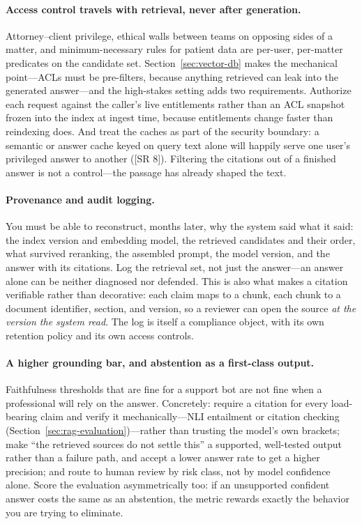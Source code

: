 \paragraph{Access control travels with retrieval, never after generation.}
Attorney--client privilege, ethical walls between teams on opposing sides of a
matter, and minimum-necessary rules for patient data are per-user, per-matter
predicates on the candidate set.  Section~\ref{sec:vector-db} makes the
mechanical point---ACLs must be pre-filters, because anything retrieved can
leak into the generated answer---and the high-stakes setting adds two
requirements.  Authorize each request against the caller's live entitlements
rather than an ACL snapshot frozen into the index at ingest time, because
entitlements change faster than reindexing does.  And treat the caches as part
of the security boundary: a semantic or answer cache keyed on query text alone
will happily serve one user's privileged answer to another ([SR 8]).
Filtering the citations out of a finished answer is not a control---the
passage has already shaped the text.

\paragraph{Provenance and audit logging.}
You must be able to reconstruct, months later, why the system said what it
said: the index version and embedding model, the retrieved candidates and
their order, what survived reranking, the assembled prompt, the model version,
and the answer with its citations.  Log the retrieval set, not just the
answer---an answer alone can be neither diagnosed nor defended.  This is also
what makes a citation verifiable rather than decorative: each claim maps to a
chunk, each chunk to a document identifier, section, and version, so a
reviewer can open the source \emph{at the version the system read}.  The log
is itself a compliance object, with its own retention policy and its own
access controls.

\paragraph{A higher grounding bar, and abstention as a first-class output.}
Faithfulness thresholds that are fine for a support bot are not fine when a
professional will rely on the answer.  Concretely: require a citation for
every load-bearing claim and verify it mechanically---NLI entailment or
citation checking (Section~\ref{sec:rag-evaluation})---rather than trusting
the model's own brackets; make ``the retrieved sources do not settle this'' a
supported, well-tested output rather than a failure path, and accept a lower
answer rate to get a higher precision; and route to human review by risk
class, not by model confidence alone.  Score the evaluation asymmetrically
too: if an unsupported confident answer costs the same as an abstention, the
metric rewards exactly the behavior you are trying to eliminate.

